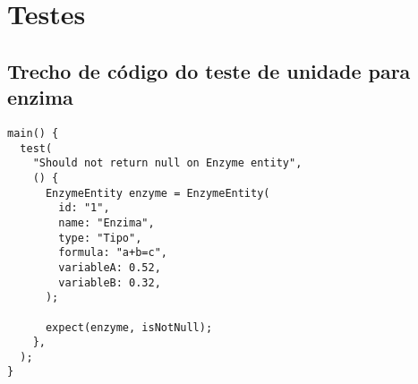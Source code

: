 \chapter{Testes}\label{ch:testes}

\section{Trecho de código do teste de unidade para enzima}\label{code:teste-unidade-enzima}
\begin{code}
\begin{verbatim}
main() {
  test(
    "Should not return null on Enzyme entity",
    () {
      EnzymeEntity enzyme = EnzymeEntity(
        id: "1",
        name: "Enzima",
        type: "Tipo",
        formula: "a+b=c",
        variableA: 0.52,
        variableB: 0.32,
      );

      expect(enzyme, isNotNull);
    },
  );
}
\end{verbatim}
\end{code}